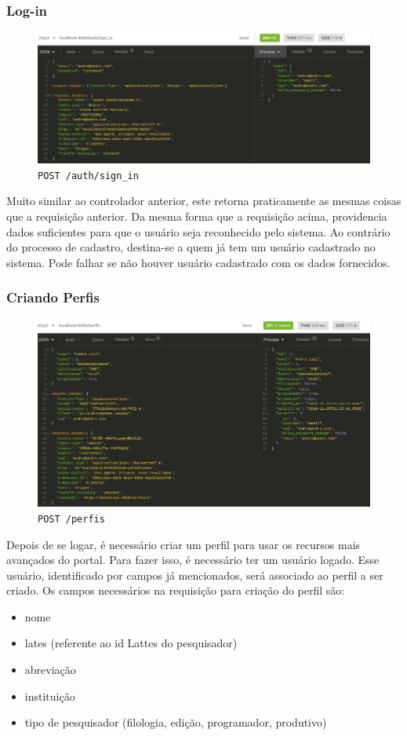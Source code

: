 \subsubsection{Log-in}

\begin{figure}[ht]
  \centering
  \includegraphics[width=.75\textwidth]{figuras/sign-in.png}
  \caption{\texttt{POST /auth/sign\_in}}
  \label{fig:sign-in}
\end{figure}

Muito similar ao controlador anterior, este retorna praticamente as mesmas coisas que a requisição anterior. Da mesma forma
que a requisição acima, providencia dados suficientes para que o usuário seja reconhecido pelo sistema. Ao contrário do
processo de cadastro, destina-se a quem já tem um usuário cadastrado no sistema. Pode falhar se não houver usuário
cadastrado com os dados fornecidos.

\subsubsection{Criando Perfis}

\begin{figure}[h]
  \centering
  \includegraphics[width=.75\textwidth]{figuras/novo-perfil.png}
  \caption{\texttt{POST /perfis}}
  \label{fig:novo-perfil}
\end{figure}

Depois de se logar, é necessário criar um perfil para usar os recursos mais avançados do portal. Para fazer isso, é
necessário ter um usuário logado. Esse usuário, identificado por campos já mencionados, será associado ao perfil a ser
criado. Os campos necessários na requisição para criação do perfil são:
\begin{itemize}
  \item nome
  \item lates (referente ao id Lattes do pesquisador)
  \item abreviação
  \item instituição
  \item tipo de pesquisador (filologia, edição, programador, produtivo)
\end{itemize}

